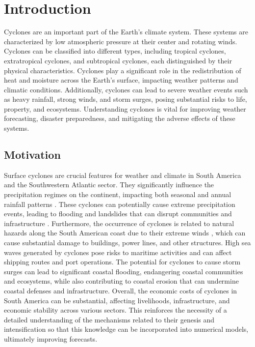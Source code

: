 \chapter{Introduction}
\label{intro}

Cyclones are an important part of the Earth's climate system. These systems are characterized by low atmospheric pressure at their center and rotating winds. Cyclones can be classified into different types, including tropical cyclones, extratropical cyclones, and subtropical cyclones, each distinguished by their physical characteristics. Cyclones play a significant role in the redistribution of heat and moisture across the Earth's surface, impacting weather patterns and climatic conditions. Additionally, cyclones can lead to severe weather events such as heavy rainfall, strong winds, and storm surges, posing substantial risks to life, property, and ecosystems. Understanding cyclones is vital for improving weather forecasting, disaster preparedness, and mitigating the adverse effects of these systems.


\section{Motivation}

Surface cyclones are crucial features for weather and climate in South America and the Southwestern Atlantic sector. They significantly influence the precipitation regimes on the continent, impacting both seasonal and annual rainfall patterns \citep{reboita2010regimes, reboita2018extratropical}. These cyclones can potentially cause extreme precipitation events, leading to flooding and landslides that can disrupt communities and infrastructure \citep{de2021ocean,de2024extreme}. Furthermore, the occurrence of cyclones is related to natural hazards along the South American coast due to their extreme winds \citep{de2021ocean,cardoso2022synoptic}, which can cause substantial damage to buildings, power lines, and other structures. High sea waves generated by cyclones \citep[e.g.]{guimaraes2014analysis,gramcianinov2023impact} pose risks to maritime activities and can affect shipping routes and port operations. The potential for cyclones to cause storm surges \citep[e.g.]{campos2010characterizatio,albuquerque2018determining,leal2023identification} can lead to significant coastal flooding, endangering coastal communities and ecosystems, while also contributing to coastal erosion \citep[e.g.]{parise2009extreme} that can undermine coastal defenses and infrastructure. Overall, the economic costs of cyclones in South America can be substantial, affecting livelihoods, infrastructure, and economic stability across various sectors. This reinforces the necessity of a detailed understanding of the mechanisms related to their genesis and intensification so that this knowledge can be incorporated into numerical models, ultimately improving forecasts.

